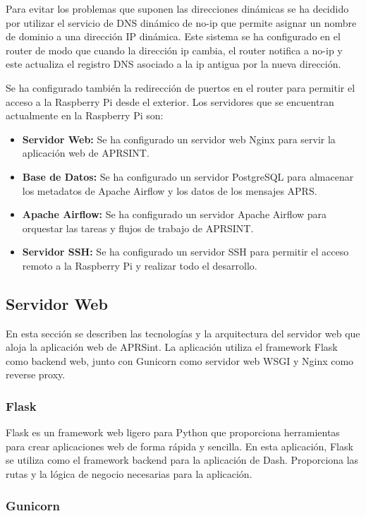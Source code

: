 Para evitar los problemas que suponen las direcciones dinámicas se ha decidido por utilizar el servicio de DNS dinámico de no-ip que permite asignar un nombre de dominio a una dirección IP dinámica. Este sistema se ha configurado en el router de modo que cuando la dirección ip cambia, el router notifica a no-ip y este actualiza el registro DNS asociado a la ip antigua por la nueva dirección.

Se ha configurado también la redirección de puertos en el router para permitir el acceso a la Raspberry Pi desde el exterior. Los servidores que se encuentran actualmente en la Raspberry Pi son:
\begin{itemize}
	\item \textbf{Servidor Web:} Se ha configurado un servidor web Nginx para servir la aplicación web de APRSINT.
	\item \textbf{Base de Datos:} Se ha configurado un servidor PostgreSQL para almacenar los metadatos de Apache Airflow y los datos de los mensajes APRS.
	\item \textbf{Apache Airflow:} Se ha configurado un servidor Apache Airflow para orquestar las tareas y flujos de trabajo de APRSINT.
	\item \textbf{Servidor SSH:} Se ha configurado un servidor SSH para permitir el acceso remoto a la Raspberry Pi y realizar todo el desarrollo.
\end{itemize}

\subsection*{Servidor Web}

En esta sección se describen las tecnologías y la arquitectura del servidor web que aloja la aplicación web de APRSint. La aplicación utiliza el framework Flask como backend web, junto con Gunicorn como servidor web WSGI y Nginx como reverse proxy.

\subsubsection*{Flask}

Flask es un framework web ligero para Python que proporciona herramientas para crear aplicaciones web de forma rápida y sencilla. En esta aplicación, Flask se utiliza como el framework backend para la aplicación de Dash. Proporciona las rutas y la lógica de negocio necesarias para la aplicación.

\subsubsection*{Gunicorn}

